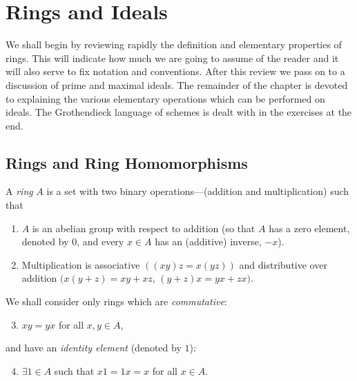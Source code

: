 \chapter{Rings and Ideals}\label{chapter1}

We shall begin by reviewing rapidly the definition and elementary properties of rings. This will indicate how much we are going to assume of the reader and it will also serve to fix notation and conventions. After this review we pass on to a discussion of prime and maximal ideals. The remainder of the chapter is devoted to explaining the various elementary operations which can be performed on ideals. The Grothendieck language of schemes is dealt with in the exercises at the end.


\section*{Rings and Ring Homomorphisms}

A \emph{ring} $A$ is a set with two binary operations---(addition and multiplication) such that
\begin{enumerate}
    \item $A$ is an abelian group with respect to addition (so that $A$ has a zero element, denoted by $0$, and every $x \in A$ has an (additive) inverse, $-x$).
    \item Multiplication is associative $((xy)z = x(yz))$ and distributive over addition $(x(y + z) = xy + xz$, $(y + z)x = yx + zx)$.
\end{enumerate}

We shall consider only rings which are \emph{commutative}:
\begin{enumerate}
    \setcounter{enumi}{2}
    \item $xy = yx$ for all $x, y \in A$,
\end{enumerate}
and have an \emph{identity element} (denoted by $1$):
\begin{enumerate}
    \setcounter{enumi}{3}
    \item $\exists 1 \in A$ such that $x1 = 1x = x$ for all $x \in A$.
\end{enumerate}

